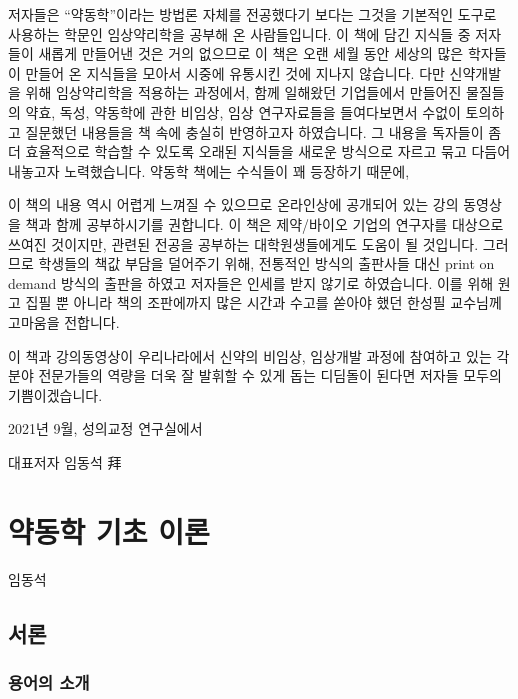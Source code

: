 \documentclass[
  11pt,
  krantz2, a4paper, twoside]{krantz}
\theoremstyle{definition}
\theoremstyle{definition}
\theoremstyle{definition}
\theoremstyle{definition}
\theoremstyle{remark}
\begin{document}
저자들은 ``약동학''이라는 방법론 자체를 전공했다기 보다는 그것을 기본적인
도구로 사용하는 학문인 임상약리학을 공부해 온 사람들입니다. 이 책에 담긴
지식들 중 저자들이 새롭게 만들어낸 것은 거의 없으므로 이 책은 오랜 세월
동안 세상의 많은 학자들이 만들어 온 지식들을 모아서 시중에 유통시킨 것에
지나지 않습니다. 다만 신약개발을 위해 임상약리학을 적용하는 과정에서,
함께 일해왔던 기업들에서 만들어진 물질들의 약효, 독성, 약동학에 관한
비임상, 임상 연구자료들을 들여다보면서 수없이 토의하고 질문했던 내용들을
책 속에 충실히 반영하고자 하였습니다. 그 내용을 독자들이 좀 더
효율적으로 학습할 수 있도록 오래된 지식들을 새로운 방식으로 자르고 묶고
다듬어 내놓고자 노력했습니다. 약동학 책에는 수식들이 꽤 등장하기 때문에,

이 책의 내용 역시 어렵게 느껴질 수 있으므로 온라인상에 공개되어 있는
강의 동영상을 책과 함께 공부하시기를 권합니다.
이 책은 제약/바이오 기업의 연구자를 대상으로 쓰여진 것이지만, 관련된 전공을 공부하는 대학원생들에게도 도움이 될 것입니다.
그러므로 학생들의 책값 부담을 덜어주기 위해, 전통적인 방식의 출판사들 대신 print on demand 방식의 출판을 하였고 저자들은 인세를 받지 않기로 하였습니다.
이를 위해 원고 집필 뿐 아니라 책의 조판에까지 많은 시간과 수고를 쏟아야 했던 한성필 교수님께 고마움을 전합니다.

이 책과 강의동영상이 우리나라에서 신약의 비임상, 임상개발 과정에 참여하고 있는 각 분야 전문가들의 역량을 더욱 잘 발휘할 수 있게 돕는 디딤돌이 된다면 저자들 모두의 기쁨이겠습니다.

\hfill 2021년 9월, 성의교정 연구실에서

\hfill 대표저자 임동석 拜

\normalsize

\mainmatter

\hypertarget{principle}{%
\chapter{약동학 기초 이론}\label{principle}}

\Large\hfill

임동석
\normalsize

\hypertarget{uxc11cuxb860}{%
\section{서론}\label{uxc11cuxb860}}

\hypertarget{uxc6a9uxc5b4uxc758-uxc18cuxac1c}{%
\subsection{용어의 소개}\label{uxc6a9uxc5b4uxc758-uxc18cuxac1c}}
\end{document}
